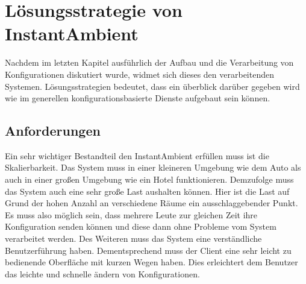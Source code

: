 \chapter{Lösungsstrategie von InstantAmbient}
Nachdem im letzten Kapitel ausführlich der Aufbau und die Verarbeitung von Konfigurationen diskutiert wurde, widmet sich dieses den verarbeitenden Systemen.
Lösungsstrategien bedeutet, dass ein überblick darüber gegeben wird wie im generellen konfigurationsbasierte Dienste aufgebaut sein können.

\section{Anforderungen}
Ein sehr wichtiger Bestandteil den InstantAmbient erfüllen muss ist die Skalierbarkeit. Das System muss in einer kleineren Umgebung wie dem Auto als auch in einer großen Umgebung wie ein Hotel funktionieren. Demzufolge muss das System auch eine sehr große Last aushalten können. Hier ist die Last auf Grund der hohen Anzahl an verschiedene Räume ein ausschlaggebender Punkt. Es muss also möglich sein, dass mehrere Leute zur gleichen Zeit ihre Konfiguration senden können und diese dann ohne Probleme vom System verarbeitet werden. Des Weiteren muss das System eine verständliche Benutzerführung haben. Dementsprechend muss der Client eine sehr leicht zu bedienende Oberfläche mit kurzen Wegen haben. Dies erleichtert dem Benutzer das leichte und schnelle ändern von Konfigurationen.   


